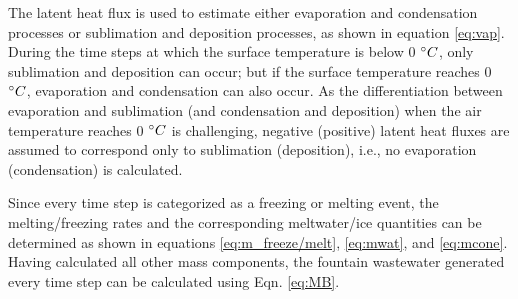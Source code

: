 The latent heat flux is used to estimate either evaporation and condensation processes or sublimation and
deposition processes, as shown in equation \ref{eq:vap}. During the time steps at which the surface temperature
is below 0 $^{\circ} C$, only sublimation and deposition can occur; but if the surface temperature reaches 0
$^{\circ} C$, evaporation and condensation can also occur. As the differentiation between evaporation and
sublimation (and condensation and deposition) when the air temperature reaches 0 $^{\circ} C$ is challenging,
negative (positive) latent heat fluxes are assumed to correspond only to sublimation (deposition), i.e., no
evaporation (condensation) is calculated.

Since every time step is categorized as a freezing or melting event, the melting/freezing rates and the
corresponding meltwater/ice quantities can be determined as shown in equations \ref{eq:m_freeze/melt},
\ref{eq:mwat}, and \ref{eq:mcone}. Having calculated all other mass components, the fountain wastewater generated
every time step can be calculated using Eqn. \ref{eq:MB}.

